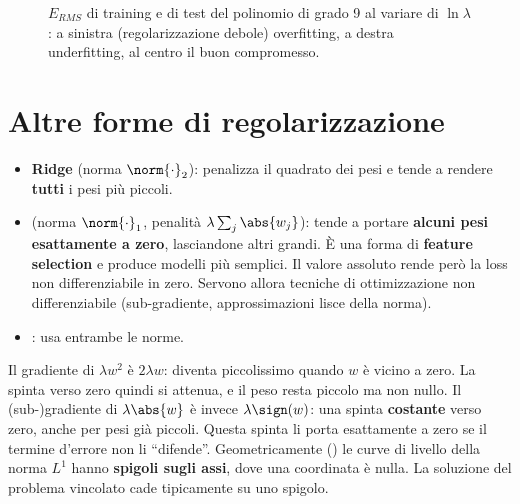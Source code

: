 \begin{figure}[ht]
\centering
{}
\caption{$E_{RMS}$ di training e di test del polinomio di grado 9 al variare di $\ln\lambda$: a sinistra
(regolarizzazione debole) overfitting, a destra underfitting, al centro il buon compromesso.}
\label{fig:rms-lambda}
\end{figure}

\begin{table}[ht]
\centering\small
\caption{Coefficienti del polinomio di grado 9 per tre valori di $\lambda$, sugli stessi dati della
.}
\label{tab:coeff-lambda}

\end{table}

\section{Altre forme di regolarizzazione}
\label{sec:l1}

\begin{itemize}
  \item \textbf{Ridge} (norma $\norm{\cdot}_2$): penalizza il quadrato dei pesi e tende a rendere \textbf{tutti} i
        pesi più piccoli.
  \item {} (norma $\norm{\cdot}_1$, penalità $\lambda\sum_j\abs{w_j}$): tende a portare \textbf{alcuni
        pesi esattamente a zero}, lasciandone altri grandi. È una forma di \textbf{feature selection} e produce
        modelli più semplici. Il valore assoluto rende però la loss non differenziabile in zero. Servono allora
        tecniche di ottimizzazione non differenziabile (sub-gradiente, approssimazioni lisce della norma).
  \item {}: usa entrambe le norme.
\end{itemize}

\begin{idea}
Il gradiente di $\lambda w^2$ è $2\lambda w$: diventa piccolissimo quando $w$ è vicino a zero. La spinta verso
zero quindi si attenua, e il peso resta piccolo ma non nullo. Il (sub-)gradiente di $\lambda\abs{w}$ è invece
$\lambda\sign(w)$: una spinta \textbf{costante} verso zero, anche per pesi già piccoli. Questa spinta li porta
esattamente a zero se il termine d'errore non li ``difende''. Geometricamente () le curve di
livello della norma $L^1$ hanno \textbf{spigoli sugli assi}, dove una coordinata è nulla. La soluzione del
problema vincolato cade tipicamente su uno spigolo.
\end{idea}

